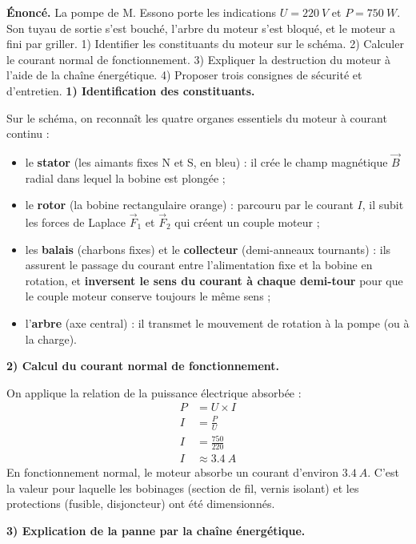 \documentclass[11pt]{article}
\begin{document}
\begin{exoresolu}
\textbf{Énoncé.} La pompe de M. Essono porte les indications $U = \SI{220}{V}$ et $P = \SI{750}{W}$. Son tuyau de sortie s'est bouché, l'arbre du moteur s'est bloqué, et le moteur a fini par griller. 1) Identifier les constituants du moteur sur le schéma. 2) Calculer le courant normal de fonctionnement. 3) Expliquer la destruction du moteur à l'aide de la chaîne énergétique. 4) Proposer trois consignes de sécurité et d'entretien.
\tcblower
\textbf{1) Identification des constituants.}

Sur le schéma, on reconnaît les quatre organes essentiels du moteur à courant continu :
\begin{itemize}
\item le \textbf{stator} (les aimants fixes N et S, en bleu) : il crée le champ magnétique $\vec{B}$ radial dans lequel la bobine est plongée ;
\item le \textbf{rotor} (la bobine rectangulaire orange) : parcouru par le courant $I$, il subit les forces de Laplace $\vec{F}_1$ et $\vec{F}_2$ qui créent un couple moteur ;
\item les \textbf{balais} (charbons fixes) et le \textbf{collecteur} (demi-anneaux tournants) : ils assurent le passage du courant entre l'alimentation fixe et la bobine en rotation, et \textbf{inversent le sens du courant à chaque demi-tour} pour que le couple moteur conserve toujours le même sens ;
\item l'\textbf{arbre} (axe central) : il transmet le mouvement de rotation à la pompe (ou à la charge).
\end{itemize}

\textbf{2) Calcul du courant normal de fonctionnement.}

On applique la relation de la puissance électrique absorbée :
\begin{align*}
P &= U \times I \\
I &= \frac{P}{U} \\
I &= \frac{750}{220} \\
I &\approx \SI{3,4}{A}
\end{align*}
En fonctionnement normal, le moteur absorbe un courant d'environ $\SI{3,4}{A}$. C'est la valeur pour laquelle les bobinages (section de fil, vernis isolant) et les protections (fusible, disjoncteur) ont été dimensionnés.

\textbf{3) Explication de la panne par la chaîne énergétique.}


\end{exoresolu}
\end{document}
